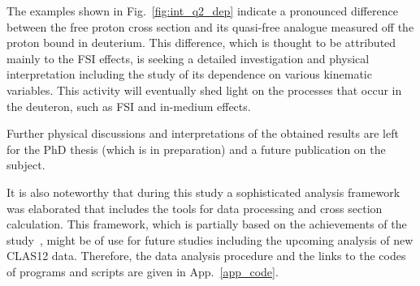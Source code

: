 The examples shown in Fig.~\ref{fig:int_q2_dep} indicate a pronounced difference between the free proton cross section and its quasi-free analogue measured off the proton bound in deuterium. This difference, which is thought to be attributed mainly to the FSI effects, is seeking a detailed investigation and physical interpretation including the study of its dependence on various kinematic variables. This activity will eventually shed light on the processes that occur in the deuteron, such as FSI and in-medium effects.

Further physical discussions and interpretations of the obtained results are left for the PhD thesis (which is in preparation) and a future publication on the subject.


It is also noteworthy that during this study a sophisticated analysis framework was elaborated that includes the tools for data processing and cross section calculation. This framework, which is partially based on the achievements of the study~\cite{Fed_an_note:2017,Fed_paper_2018}, might be of use for future studies including the upcoming analysis of new CLAS12 data. Therefore, the data analysis procedure and the links to the codes of programs and scripts are given in App.~\ref{app_code}.


